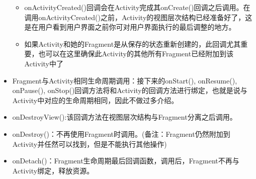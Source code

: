 \documentclass[9pt, b5paaper]{book}
\begin{document}
\begin{itemize}
\begin{itemize}
\item onActivityCreated()回调会在Activity完成其onCreate()回调之后调用。在调用onActivityCreated()之前，Activity的视图层次结构已经准备好了，这是在用户看到用户界面之前你可对用户界面执行的最后调整的地方。
\item 如果Activity和她的Fragment是从保存的状态重新创建的，此回调尤其重要，也可以在这里确保此Activity的其他所有Fragment已经附加到该Activity中了
\end{itemize}
\item Fragment与Activity相同生命周期调用：接下来的onStart(), onResume(), onPause(), onStop()回调方法将和Activity的回调方法进行绑定，也就是说与Activity中对应的生命周期相同，因此不做过多介绍。
\item onDestroyView():该回调方法在视图层次结构与Fragment分离之后调用。
\item onDestroy()：不再使用Fragment时调用。(备注：Fragment仍然附加到Activity并任然可以找到，但是不能执行其他操作)
\item onDetach()：Fragment生命周期最后回调函数，调用后，Fragment不再与Activity绑定，释放资源。
\end{itemize}
\end{document}
